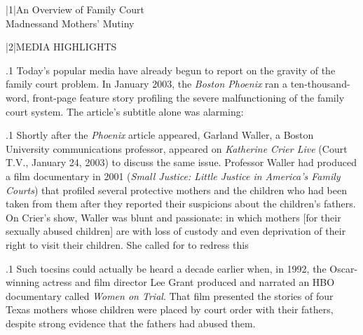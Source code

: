 \documentclass[11pt, twoside]{article}
\begin{document}
\thispagestyle{empty}

{\fontsize{13}{19}\selectfont


\hspace{-5em}\begin{minipage}{1.1\textwidth}
\begin{flushright}
{\fontsize{14}{22}\selectfont
\textbf{%
}
}
\end{flushright}
\end{minipage}


\vspace{6em}





\s|1|{An Overview of Family Court\\\vspace{7pt}\hfill{}Madness\mdash{}and Mothers’ Mutiny}


\s|2|{MEDIA HIGHLIGHTS}

\p.1{%
\noindent{}Today’s popular media have already begun to report on the gravity of
the family court problem. In January 2003, the \textit{Boston Phoenix} ran a
ten-thousand-word, front-page feature story profiling the severe malfunctioning of the family court system. The article’s subtitle alone was
alarming: 
}%

\p.1{%
Shortly after the \textit{Phoenix} article appeared, Garland Waller, a Boston
University communications professor, appeared on \textit{Katherine Crier Live}
(Court T.V., January 24, 2003) to discuss the same issue. Professor
Waller had produced a film documentary in 2001 (\textit{Small Justice: Little Justice in America’s Family Courts}) that profiled several protective
mothers and the children who had been taken from them after they reported their suspicions about the children’s fathers. On Crier’s show,
Waller was blunt and passionate:  in which mothers  [for their sexually abused children] are  with loss of custody and even deprivation of their right to
visit their children. She called for  to redress this
}%

\p.1{%
Such tocsins could actually be heard a decade earlier when, in 1992,
the Oscar-winning actress and film director Lee Grant produced and
narrated an HBO documentary called \textit{Women on Trial}. That film presented the stories of four Texas mothers whose children were placed by
court order with their fathers, despite strong evidence that the fathers
had abused them.
}%

}
\end{document}
